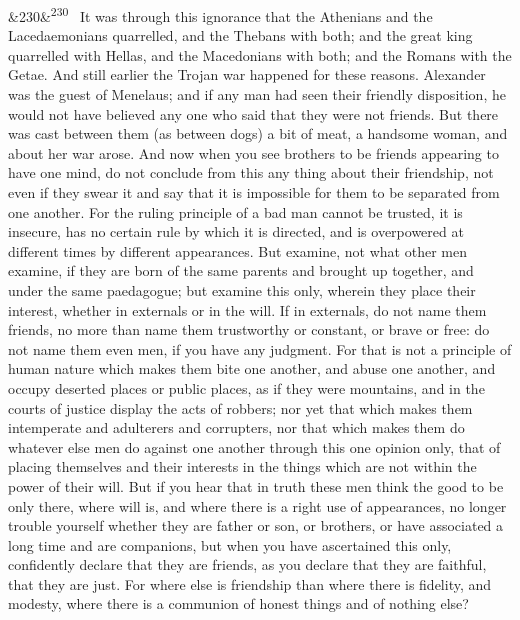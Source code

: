 \documentclass[12pt]{article}
\newcommand{\para}[1][]{\par\noindent\ifx&#1&\else\textsuperscript{\footnotesize #1}~\fi}
\begin{document}
\para[230] It was through this ignorance that the Athenians and the Lacedaemonians quarrelled, and the Thebans with both; and the great king quarrelled with Hellas, and the Macedonians with both; and the Romans with the Getae. And still earlier the Trojan war happened for these reasons. Alexander was the guest of Menelaus; and if any man had seen their friendly disposition, he would not have believed any one who said that they were not friends. But there was cast between them (as between dogs) a bit of meat, a handsome woman, and about her war arose. And now when you see brothers to be friends appearing to have one mind, do not conclude from this any thing about their friendship, not even if they swear it and say that it is impossible for them to be separated from one another. For the ruling principle of a bad man cannot be trusted, it is insecure, has no certain rule by which it is directed, and is overpowered at different times by different appearances. But examine, not what other men examine, if they are born of the same parents and brought up together, and under the same paedagogue; but examine this only, wherein they place their interest, whether in externals or in the will. If in externals, do not name them friends, no more than name them trustworthy or constant, or brave or free: do not name them even men, if you have any judgment. For that is not a principle of human nature which makes them bite one another, and abuse one another, and occupy deserted places or public places, as if they were mountains, and in the courts of justice display the acts of robbers; nor yet that which makes them intemperate and adulterers and corrupters, nor that which makes them do whatever else men do against one another through this one opinion only, that of placing themselves and their interests in the things which are not within the power of their will. But if you hear that in truth these men think the good to be only there, where will is, and where there is a right use of appearances, no longer trouble yourself whether they are father or son, or brothers, or have associated a long time and are companions, but when you have ascertained this only, confidently declare that they are friends, as you declare that they are faithful, that they are just. For where else is friendship than where there is fidelity, and modesty, where there is a communion of honest things and of nothing else?
\end{document}
